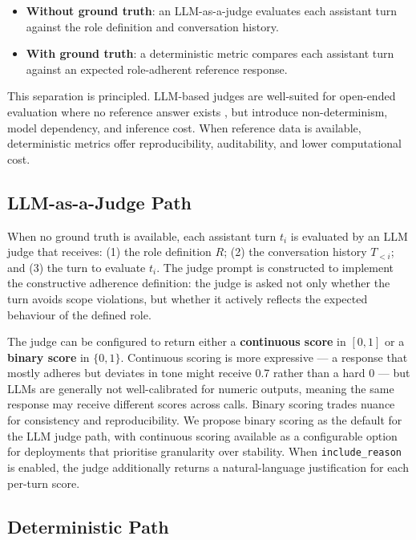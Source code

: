 \documentclass[11pt,a4paper]{article}
\begin{document}
\begin{itemize}
  \item \textbf{Without ground truth}: an LLM-as-a-judge evaluates each
        assistant turn against the role definition and conversation history.
  \item \textbf{With ground truth}: a deterministic metric compares each
        assistant turn against an expected role-adherent reference response.
\end{itemize}

This separation is principled. LLM-based judges are well-suited for
open-ended evaluation where no reference answer exists \citep{zheng2023judging},
but introduce non-determinism, model dependency, and inference cost. When
reference data is available, deterministic metrics offer reproducibility,
auditability, and lower computational cost.

\subsection{LLM-as-a-Judge Path}

When no ground truth is available, each assistant turn $t_i$ is evaluated by
an LLM judge that receives: (1) the role definition $R$; (2) the conversation
history $T_{<i}$; and (3) the turn to evaluate $t_i$. The judge prompt is
constructed to implement the constructive adherence definition: the judge is
asked not only whether the turn avoids scope violations, but whether it
actively reflects the expected behaviour of the defined role.

The judge can be configured to return either a \textbf{continuous score} in
$[0, 1]$ or a \textbf{binary score} in $\{0, 1\}$. Continuous scoring is more
expressive --- a response that mostly adheres but deviates in tone might
receive 0.7 rather than a hard 0 --- but LLMs are generally not well-calibrated
for numeric outputs, meaning the same response may receive different scores
across calls. Binary scoring trades nuance for consistency and reproducibility.
We propose binary scoring as the default for the LLM judge path, with
continuous scoring available as a configurable option for deployments that
prioritise granularity over stability. When \texttt{include\_reason} is
enabled, the judge additionally returns a natural-language justification for
each per-turn score.

\subsection{Deterministic Path}
\label{sec:deterministic}
\end{document}
